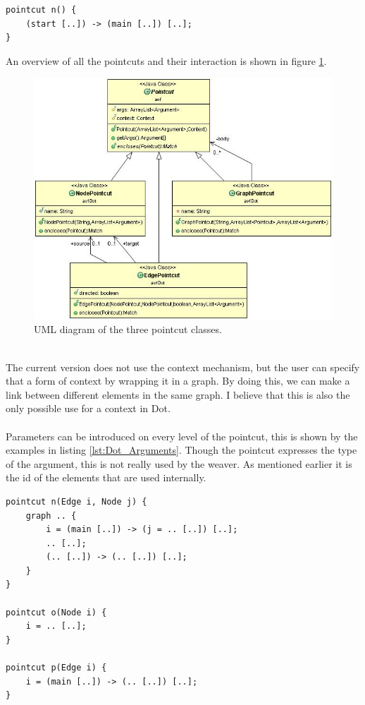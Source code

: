 \documentclass[a4paper]{report}
\begin{document}
\begin{lstlisting}[caption=An edge pointcut matching any edge from start to main, label=lst:Dot_EdgePointcut]
pointcut n() {
	(start [..]) -> (main [..]) [..];
}
\end{lstlisting}
An overview of all the pointcuts and their interaction is shown in figure \ref{fig:DotPointcuts}.
\begin{figure}
\centering
\includegraphics[scale=0.6]{images/AOFDot/DotPointcuts.jpg}
\caption{UML diagram of the three pointcut classes.}
\label{fig:DotPointcuts}
\end{figure}
\\
The current version does not use the context mechanism, but the user can specify that a form of context by wrapping it in a graph. By doing this, we can make a link between different elements in the same graph. I believe that this is also the only possible use for a context in Dot.\\
\\
Parameters can be introduced on every level of the pointcut, this is shown by the examples in listing \ref{lst:Dot_Arguments}. Though the pointcut expresses the type of the argument, this is not really used by the weaver. As mentioned earlier it is the id of the elements that are used internally.
\begin{lstlisting}[caption=Examples showing the use of arguments, label=lst:Dot_Arguments]
pointcut n(Edge i, Node j) {
	graph .. {
		i = (main [..]) -> (j = .. [..]) [..];
		.. [..];
		(.. [..]) -> (.. [..]) [..];
	}
}

pointcut o(Node i) {
	i = .. [..];
}

pointcut p(Edge i) {
	i = (main [..]) -> (.. [..]) [..];
}
\end{lstlisting}
\end{document}
